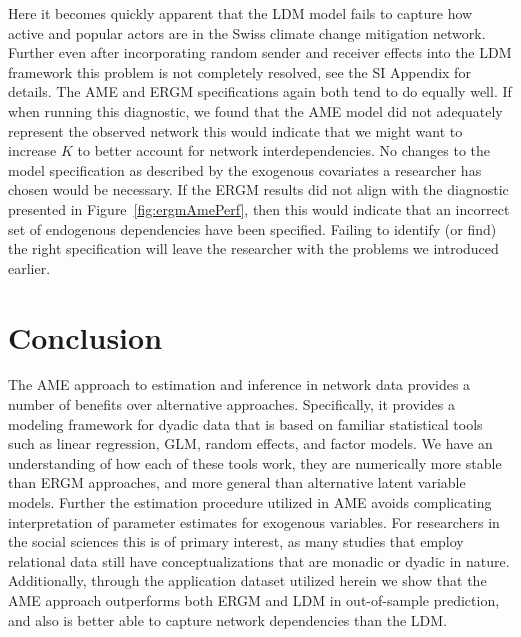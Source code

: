 \documentclass[12pt,twocolumn,twoside]{pnas-new}
\begin{document}
Here it becomes quickly apparent that the LDM model fails to capture how active and popular actors are in the Swiss climate change mitigation network. Further even after incorporating random sender and receiver effects into the LDM framework this problem is not completely resolved, see the SI Appendix for details. The AME and ERGM specifications again both tend to do equally well. If when running this diagnostic, we found that the AME model did not adequately represent the observed network this would indicate that we might want to increase $K$ to better account for network interdependencies. No changes to the model specification as described by the exogenous covariates a researcher has chosen would be necessary. If the ERGM results did not align with the diagnostic presented in Figure~\ref{fig:ergmAmePerf}, then this would indicate that an incorrect set of endogenous dependencies have been specified. Failing to identify (or find) the right specification will leave the researcher with the problems we introduced earlier.

\section*{\textbf{Conclusion}}

The AME approach to estimation and inference in network data provides a number of benefits over alternative approaches. Specifically, it provides a modeling framework for dyadic data that is based on familiar statistical tools such as linear regression, GLM, random effects, and factor models. We have an understanding of how each of these tools work, they are numerically more stable than ERGM approaches, and more general than alternative latent variable models. Further the estimation procedure utilized in AME avoids complicating interpretation of parameter estimates for exogenous variables. For researchers in the social sciences this is of primary interest, as many studies that employ relational data still have conceptualizations that are monadic or dyadic in nature. Additionally, through the application dataset utilized herein we show that the AME approach outperforms both ERGM and LDM in out-of-sample prediction, and also is better able to capture network dependencies than the LDM.
\end{document}
